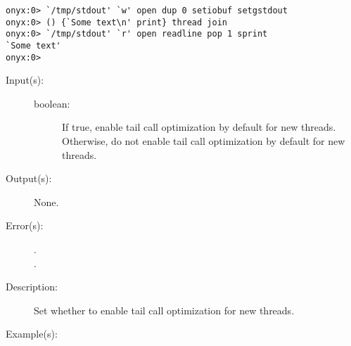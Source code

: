 \begin{description}
\begin{description}
\begin{verbatim}
onyx:0> `/tmp/stdout' `w' open dup 0 setiobuf setgstdout
onyx:0> () {`Some text\n' print} thread join
onyx:0> `/tmp/stdout' `r' open readline pop 1 sprint
`Some text'
onyx:0>
		\end{verbatim}
	\end{description}
\label{systemdict:setgtailopt}
\item[{\onyxop{boolean}{setgtailopt}{--}}: ]
	\begin{description}\item[]
	\item[Input(s): ]
		\begin{description}\item[]
		\item[boolean: ]
			If true, enable tail call optimization by default for
			new threads.  Otherwise, do not enable tail call
			optimization by default for new threads.
		\end{description}
	\item[Output(s): ] None.
	\item[Error(s): ]
		\begin{description}\item[]
		\item[.]
		\item[.]
		\end{description}
	\item[Description: ]
		Set whether to enable tail call optimization for new threads.
	\item[Example(s): ]\begin{verbatim}


\end{verbatim}
\end{description}
\end{description}
